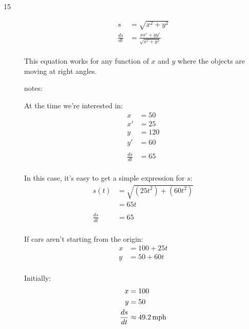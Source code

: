 \documentclass[letterpaper, landscape]{exam}
\begin{document}
\begin{description}
    \item[15]
      \begin{align*}
        s             & = \sqrt{x^2 + y^2} \\
        \frac{ds}{dt} & = \frac{x x' + y y'}{\sqrt{x^2 + y^2}} \\
      \end{align*}

      This equation works for any function of $x$ and $y$ where the objects are moving at right angles.

      notes:

      At the time we're interested in:
      \begin{align*}
        x             & = 50 \\
        x'            & = 25 \\
        y             & = 120 \\
        y'            & = 60 \\
        \\
        \frac{ds}{dt} & = 65 \\
      \end{align*}

      In this case, it's easy to get a simple expression for $s$:
      \begin{align*}
        s(t)          & = \sqrt{(25t^2) + (60t^2)} \\
                      & = 65t \\
        \\
        \frac{ds}{dt} & = 65 \\
      \end{align*}

      If cars aren't starting from the origin:
      \begin{align*}
        x &= 100 + 25t \\
        y &= 50 + 60t \\
      \end{align*}

      Initially:
      \begin{align*}
        x             & = 100 \\
        y             & = 50 \\
        \frac{ds}{dt} & \approx \unit[49.2]{mph}
      \end{align*}


\end{description}
\end{document}
